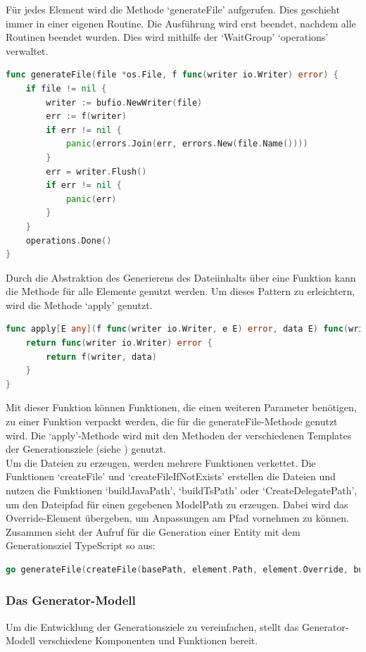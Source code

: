 \documentclass[./einleitung.tex]{subfiles}
\begin{document}
    Für jedes Element wird die Methode `generateFile' aufgerufen.
    Dies geschieht immer in einer eigenen Routine.
    Die Ausführung wird erst beendet, nachdem alle Routinen beendet wurden.
    Dies wird mithilfe der `WaitGroup' `operations' verwaltet.
    \begin{lstlisting}[language=Go, caption=Die Methode generateFile, label=lst:generateFile]
func generateFile(file *os.File, f func(writer io.Writer) error) {
	if file != nil {
		writer := bufio.NewWriter(file)
		err := f(writer)
		if err != nil {
			panic(errors.Join(err, errors.New(file.Name())))
		}
		err = writer.Flush()
		if err != nil {
			panic(err)
		}
	}
	operations.Done()
}
    \end{lstlisting}
    Durch die Abstraktion des Generierens des Dateiinhalts über eine Funktion kann die Methode für alle Elemente genutzt werden.
    \newpage
    Um dieses Pattern zu erleichtern, wird die Methode `apply' genutzt.
    \begin{lstlisting}[language=Go, caption=Die apply-Methode, label=lst:apply]
func apply[E any](f func(writer io.Writer, e E) error, data E) func(writer io.Writer) error {
	return func(writer io.Writer) error {
		return f(writer, data)
	}
}
    \end{lstlisting}
    Mit dieser Funktion können Funktionen, die einen weiteren Parameter benötigen, zu einer Funktion verpackt werden, die für die generateFile-Methode genutzt wird.
    Die `apply'-Methode wird mit den Methoden der verschiedenen Templates der Generationsziele (siehe ) genutzt.\\

    Um die Dateien zu erzeugen, werden mehrere Funktionen verkettet.
    Die Funktionen `createFile' und `createFileIfNotExists' erstellen die Dateien und nutzen die Funktionen `buildJavaPath', `buildTsPath' oder `CreateDelegatePath', um den Dateipfad für einen gegebenen ModelPath zu erzeugen.
    Dabei wird das Override-Element übergeben, um Anpassungen am Pfad vornehmen zu können.\\
    Zusammen sieht der Aufruf für die Generation einer Entity mit dem Generationsziel TypeScript so aus:
    \begin{lstlisting}[language=Go, caption=Generation einer Entity, label=lst:generateEntity]
go generateFile(createFile(basePath, element.Path, element.Override, buildTsPath), apply(template.GenerateEntity, element))
    \end{lstlisting}

    \subsubsection{Das Generator-Modell}\label{subsubsec:generator-modell}
    Um die Entwicklung der Generationsziele zu vereinfachen, stellt das Generator-Modell verschiedene Komponenten und Funktionen bereit.
\end{document}
